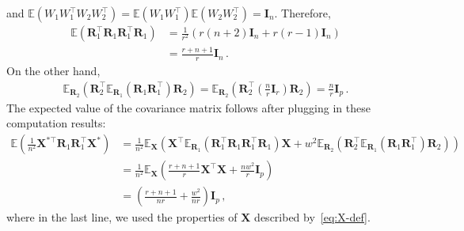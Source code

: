 \documentclass[11pt]{article}
\newcommand{\bX}{\boldsymbol{X}}
\newcommand{\bI}{\boldsymbol{I}}
\newcommand{\bR}{\boldsymbol{R}}
\newcommand{\Expected}{\mathbb{E}}
\begin{document}
and $\Expected\left(W_1W_1^\top W_2W_2^\top\right) = \Expected\left(W_1W_1^\top\right)\Expected\left( W_2W_2^\top\right)= \bI_n$. Therefore, 
\begin{align}\label{eq:rho-eq3}
    \Expected(\bR_1^\top \bR_1 \bR_1^\top \bR_1) &=  \frac{1}{r^2}\left(r(n+2)\bI_n+r(r-1)\bI_n\right)\nonumber\\
        &=  \frac{r+n+1}{r}\bI_n\,.
\end{align}
On the other hand,
\begin{align*}
    \Expected_{\bR_2}(\bR_2^\top \Expected_{\bR_1}(\bR_1 \bR_1^\top) \bR_2) =  \Expected_{\bR_2}\left(\bR_2^\top \left(\frac{n}{r}\bI_r\right) \bR_2\right)
    = \frac{n}{r}\bI_p\,.
\end{align*}
The expected value of the covariance matrix follows after plugging in these computation results:
\begin{align*}
    \Expected\left(\frac{1}{n^2}\bX^{*\top}\bR_1\bR_1^\top\bX^*\right) &= \frac{1}{n^2}\Expected_{\bX}(\bX^\top \Expected_{\bR_1}(\bR_1^\top \bR_1 \bR_1^\top \bR_1)\bX+w^2\Expected_{\bR_2}(\bR_2^\top \Expected_{\bR_1}(\bR_1 \bR_1^\top) \bR_2))\\
        &= \frac{1}{n^2 }\Expected_{\bX}\left(\frac{r+n+1}{r}\bX^\top\bX+\frac{nw^2}{r}\bI_p\right)\\
        &=  \left(\frac{r+n+1}{ nr}+\frac{w^2}{nr}\right)\bI_p\,,
\end{align*}
where in the last line, we used the properties of $\bX$ described by~\eqref{eq:X-def}.
\end{document}
